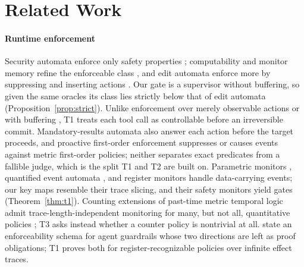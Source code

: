 \section{Related Work}\label{sec:related}

\paragraph{Runtime enforcement}
Security automata enforce only safety properties \citep{schneider2000enforceable};
computability and monitor memory refine the enforceable class
\citep{hamlen2006computability,fong2004shallow,talhi2008memory}, and edit automata enforce
more by suppressing and inserting actions \citep{ligatti2005edit}. Our gate is a
supervisor \citep{ramadge1987supervisory} without buffering, so given the same oracles its
class lies strictly below that of edit automata (Proposition~\ref{prop:strict}).
Unlike enforcement over merely observable actions \citep{basin2013enforceable} or with
buffering \citep{falcone2012verify}, T1 treats each tool call as controllable before an
irreversible commit. Mandatory-results automata \citep{ligatti2010mra} also answer each action
before the target proceeds, and proactive first-order enforcement \citep{hublet2024proactive}
suppresses or causes events against metric first-order policies; neither separates exact
predicates from a fallible judge, which is the split T1 and T2 are built on.
Parametric monitors \citep{rosu2012parametric}, quantified event automata
\citep{barringer2012qea}, and register monitors \citep{grigore2013register} handle
data-carrying events; our key maps resemble their trace slicing, and their safety monitors yield gates
(Theorem~\ref{thm:t1}). Counting
extensions of past-time metric temporal logic admit trace-length-independent monitoring for many,
but not all, quantitative policies \citep{du2021tracelength}; T3 asks instead whether a
counter policy is nontrivial at all. \citet{david2026alignment} state an enforceability
schema for agent guardrails whose two directions are left as proof obligations; T1 proves
both for register-recognizable policies over infinite effect traces.

